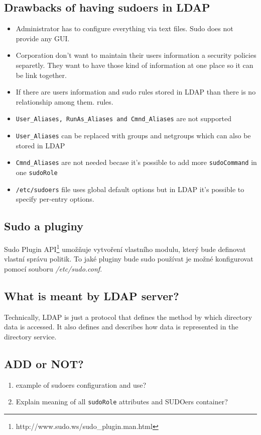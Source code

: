 \documentclass[12pt,a4paper,titlepage,final]{article}
\begin{document}
\subsection{Drawbacks of having sudoers in LDAP}\label{sec:sudo_ldap_drawbacks}
\begin{itemize} 
	\item Administrator has to configure everything via text files. Sudo does not
		provide any GUI.
	\item Corporation don't want to maintain their users information a security
		policies separetly. They want to have those kind of information at one place
		so it can be link together.
	\item If there are users information and sudo rules stored in LDAP than there
		is no relationship among them.
		rules.
	\item \texttt{User\_Aliases, RunAs\_Aliases and Cmnd\_Aliases} are not supported
	\item \texttt{User\_Aliases} can be replaced with groups and netgroups which can
		also be stored in LDAP
	\item \texttt{Cmnd\_Aliases} are not needed becase it's possible to add more
		\texttt{sudoCommand} in one \texttt{sudoRole}
	\item \texttt{/etc/sudoers} file uses global default options but in LDAP it's
		possible to specify per-entry options.
\end{itemize}

\subsection{Sudo a pluginy}
Sudo Plugin API\footnote{http://www.sudo.ws/sudo\_plugin.man.html}
umožňuje vytvoření vlastního modulu, který bude definovat vlastní správu
politik.  To jaké pluginy bude sudo používat je možné konfigurovat pomocí
souboru \textit{/etc/sudo.conf}.

\subsection{What is meant by LDAP server?}
Technically, LDAP is just a protocol that defines the method by which directory
data is accessed. It also defines and describes how data is represented in the
directory service.

{\color{blue}
\subsection{ADD or NOT?}
\begin{enumerate} 
	\item example of sudoers configuration and use?
	\item Explain meaning of all \texttt{sudoRole} attributes and SUDOers container?
\end{enumerate} 
}
\end{document}
